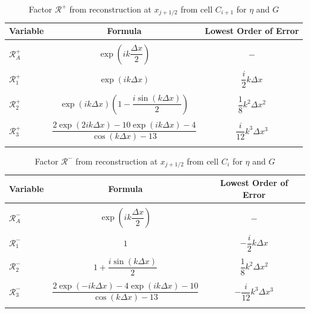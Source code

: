\begin{table}
\centering
	\begin{tabular}{l  c  c}
		Variable& Formula& Lowest Order of Error\\
		\hline && \\
		$\mathcal{R}^+_A$& $\exp\left(i k \dfrac{\Delta x}{2}\right)$ & $-$ \\ & & \\
		$\mathcal{R}^+_1$& $\exp\left(i k {\Delta x}\right)$ & $\dfrac{i}{2}k \Delta x$ \\ & & \\
		$\mathcal{R}^+_2$& $\exp\left(i k {\Delta x}\right) \left(1 - \dfrac{i \sin\left(k\Delta x \right)}{2} \right)$ & $\dfrac{1}{8}k^2 \Delta x^2$ \\ & & \\
		$\mathcal{R}^+_3$& $\dfrac{2\exp\left(2ik \Delta x\right) - 10\exp\left(ik \Delta x\right) - 4}{\cos\left(k \Delta x\right) - 13}$ & $\dfrac{i}{12}k^3 \Delta x^3$ \\ & & \\
	\end{tabular}
	\caption{Factor $\mathcal{R}^+$ from reconstruction at $x_{j+1/2}$ from cell $C_{i+1}$ for $\eta$ and $G$}
	\label{tab:Rpfactor}
\end{table}

\begin{table}
	\centering
	\begin{tabular}{l  c  c}
	 	Variable& Formula& Lowest Order of Error\\
	 	\hline && \\
	 	$\mathcal{R}^-_A$& $\exp\left(i k \dfrac{\Delta x}{2}\right)$ & $-$ \\ & & \\
	 	$\mathcal{R}^-_1$& $1$ & $-\dfrac{i}{2}k \Delta x$ \\ & & \\
	 	$\mathcal{R}^-_2$& $1 +  \dfrac{i \sin\left(k\Delta x \right)}{2}$ & $\dfrac{1}{8}k^2 \Delta x^2$ \\ & & \\
	 	$\mathcal{R}^-_3$& $\dfrac{2 \exp\left(-i k \Delta x\right) - 4\exp\left(i k \Delta x\right) - 10}{\cos\left(k \Delta x\right) - 13}$ & $-\dfrac{i}{12}k^3 \Delta x^3$ \\ & & \\
	\end{tabular}
	\caption{Factor $\mathcal{R}^-$ from reconstruction at $x_{j+1/2}$ from cell $C_{i}$ for $\eta$ and $G$}
	\label{tab:Rmfactor}
\end{table}


